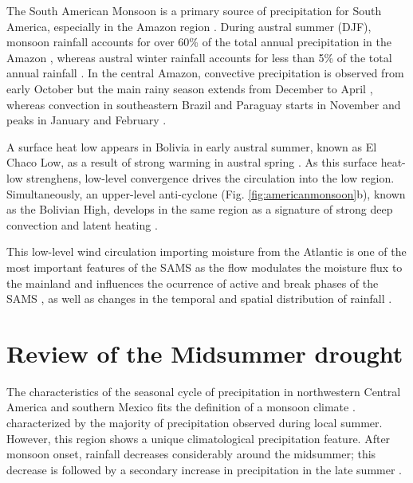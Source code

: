 The South American Monsoon is a primary source of precipitation for South America, especially in the Amazon region \citep{gan2004,vera2006,jones2013}.
During austral summer (DJF), monsoon rainfall accounts for over 60\% of the total annual precipitation in the Amazon \citep{gan2004,marengo2012}, whereas
austral winter rainfall accounts for less than 5\% of the total annual rainfall \citep{vera2006}.
In the central Amazon, convective precipitation is observed from early October but the main rainy season extends from December to April \citep{machado2004,adams2013}, whereas convection in southeastern Brazil and Paraguay starts in November and peaks in January and February \citep{marengo2001,nieto2011}. 

A surface heat low appears in Bolivia in early austral summer, known as El Chaco Low, as a result of strong warming in austral spring \citep{marengo2012,sulca2018}.
 As this surface heat-low strenghens, low-level convergence drives the circulation into the low region.
 Simultaneously, an upper-level anti-cyclone (Fig. \ref{fig:americanmonsoon}b), known as the Bolivian High, develops in the same region as a signature of strong deep convection and latent heating \citep{marengo2001,vera2006}.

This low-level wind circulation importing moisture from the Atlantic is one of the most important features of the SAMS \citep{marengo2012,wang2017} as the flow modulates the moisture flux to the mainland and influences the ocurrence of active and break phases of the SAMS \citep{jones2002}, as well as changes in the temporal and spatial
distribution of rainfall \citep[e.g.][]{giannini2004,bombardi2011}.


\section{Review of the Midsummer drought}\label{sq:litmsd}


The characteristics of the seasonal cycle of precipitation in northwestern Central America and southern Mexico fits the definition of a monsoon climate \citep{wang2017}. characterized by the majority of precipitation observed during local summer. 
However, this region shows a unique climatological precipitation feature. After monsoon onset, rainfall decreases considerably around the midsummer; this decrease is followed by a secondary increase in precipitation in the late summer \citep{mosino1966}. 


